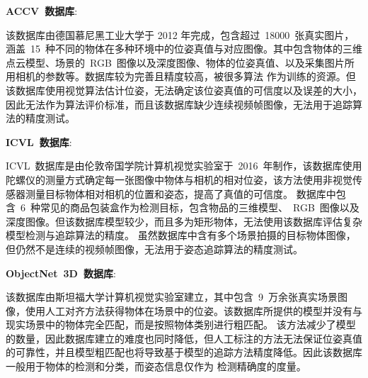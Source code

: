 \vskip0.2cm
\noindent\textbf{ACCV~数据库}\cite{HinterstoisserGradientResponseMaps2012}:

该数据库由德国慕尼黑工业大学于 2012 年完成，包含超过~18000~张真实图片，涵盖~15~种不同的物体在多种环境中的位姿真值与对应图像。其中包含物体的三维点云模型、场景的~RGB~图像以及深度图像、物体的位姿真值、以及采集图片所用相机的参数等。数据库较为完善且精度较高，被很多算法
作为训练的资源。但该数据库使用视觉算法估计位姿，无法确定该位姿真值的可信度以及误差的大小，因此无法作为算法评价标准，而且该数据库缺少连续视频帧图像，无法用于追踪算法的精度测试。

\vskip0.2cm
\noindent\textbf{ICVL~数据库}\cite{DoumanoglouRecovering6DObject2015}:

ICVL~数据库是由伦敦帝国学院计算机视觉实验室于~2016~年制作，该数据库使用陀螺仪的测量方式确定每一张图像中物体与相机的相对位姿，该方法使用非视觉传感器测量目标物体相对相机的位置和姿态，提高了真值的可信度。
数据库中包含~6~种常见的商品包装盒作为检测目标，包含物品的三维模型、~RGB~图像以及深度图像。但该数据库模型较少，而且多为矩形物体，无法使用该数据库评估复杂模型检测与追踪算法的精度。
虽然数据库中含有多个场景拍摄的目标物体图像，但仍然不是连续的视频帧图像，无法用于姿态追踪算法的精度测试。

\vskip0.2cm
\noindent\textbf{ObjectNet~3D~数据库}\cite{XiangObjectnet3dLargeScale2016}:

该数据库由斯坦福大学计算机视觉实验室建立，其中包含~9~万余张真实场景图像，使用人工对齐方法获得物体在场景中的位姿。该数据库所提供的模型并没有与现实场景中的物体完全匹配，而是按照物体类别进行粗匹配。
该方法减少了模型的数量，因此数据库建立的难度也同时降低，但人工标注的方法无法保证位姿真值的可靠性，并且模型粗匹配也将导致基于模型的追踪方法精度降低。因此该数据库一般用于物体的检测和分类，而姿态信息仅作为
检测精确度的度量。

